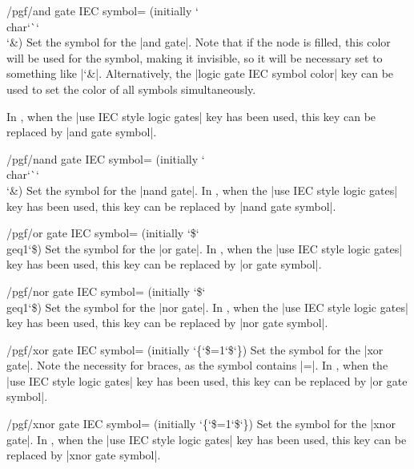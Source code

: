 \begin{key}{/pgf/and gate IEC symbol= (initially \char`\\char\char`\`\char`\\\char`\&)}
  Set the symbol for the |and gate|. Note that if the node is filled,
  this color will be used for the symbol, making it invisible, so
  it will be necessary set  to something like
  |\color{black}\char`\&|. Alternatively, the 
  |logic gate IEC symbol color| key can be used to set the color
  of all symbols simultaneously.
  
  In \tikzname, when the |use IEC style logic gates| key has been 
  used, this key can be replaced by |and gate symbol|.
\end{key}

\begin{key}{/pgf/nand gate IEC symbol= (initially \char`\\char\char`\`\char`\\\char`\&)}
  Set the symbol for the |nand gate|.  
  In \tikzname, when the |use IEC style logic gates| key has been 
  used, this key can be replaced by |nand gate symbol|.
\end{key}

\begin{key}{/pgf/or gate IEC symbol= (initially \char`\$\char`\\geq1\char`\$)}
  Set the symbol for the |or gate|.  
  In \tikzname, when the |use IEC style logic gates| key has been 
  used, this key can be replaced by |or gate symbol|.
\end{key}

\begin{key}{/pgf/nor gate IEC symbol= (initially \char`\$\char`\\geq1\char`\$)}
  Set the symbol for the |nor gate|.  
  In \tikzname, when the |use IEC style logic gates| key has been 
  used, this key can be replaced by |nor gate symbol|.
\end{key}

\begin{key}{/pgf/xor gate IEC symbol= (initially \char`\{\char`\$=1\char`\$\char`\})}
  Set the symbol for the |xor gate|. Note the necessity for braces,
  as the symbol contains |=|.
  In \tikzname, when the |use IEC style logic gates| key has been 
  used, this key can be replaced by |or gate symbol|.
\end{key}

\begin{key}{/pgf/xnor gate IEC symbol= (initially  \char`\{\char`\$=1\char`\$\char`\})}
  Set the symbol for the |xnor gate|.  
  In \tikzname, when the |use IEC style logic gates| key has been 
  used, this key can be replaced by |xnor gate symbol|.
\end{key}


